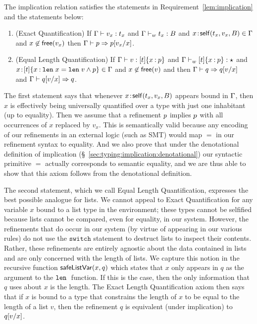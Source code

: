 \begin{requirement}\label{lem:implicationD}
  The implication relation satisfies the statements
  in Requirement~\ref{lem:implication} and the statements below:
  \begin{enumerate}
      \item (Exact Quantification) If
      $\hastype{\tcenv}{v_x}{t_x}$ and
      $\isWellFormed{\tcenv}{t_x}{\skbase}$ and 
      $\bind{x}{\self{t_x}{v_x}{\skbase}} \in \tcenv$ 
      and $x\not\in \free{v_x}$ then
      $\imply{\tcenv}{\spred}{\subst{\spred}{x}{v_x}}$.
      \item (Equal Length Quantification) If
      $\hastype{\tcenv}{\sval}{\breft{\listtype{\stype}}{x}{\spred}}$ and
      $\isWellFormed{\tcenv}{\breft{\listtype{\stype}}{x}{\spred}}{\skstar}$ and \\
      $\bind{x}{\breft{\listtype{\stype}}{x}{\len x = \len \sval \wedge \spred}} \in \tcenv$ 
      and $x\not\in \free{\sval}$ and  then
      $\imply{\tcenv}{q}{\subst{q}{x}{\sval}}$\\
      and
      $\imply{\tcenv}{\subst{q}{x}{\sval}}{q}$.
  \end{enumerate}
\end{requirement}

\noindent
The first statement says that whenever 
$\bind{x}{\self{t_x}{v_x}{\skbase}}$ appears 
bound in $\tcenv$, then $x$ is effectively being
universally quantified over a type with just one
inhabitant (up to equality). Then we assume 
that a refinement $\spred$ implies $\spred$ with
all occurrences of $x$ replaced by $v_x$.
%
This is semantically valid because any encoding of 
our refinements in an external logic (such as SMT)
would map $=$ in our refinement syntax to equality.
%
And we also prove that under the denotational definition of
implication (\S~\ref{sec:typing:implication:denotational})
our syntactic primitive $=$ actually corresponds to semantic
equality, and we are thus able to show that this axiom
follows from the denotational definition.

The second statement, which we call Equal Length Quantification,
expresses the best possible analogue for lists. We cannot
appeal to Exact Quantification for any variable $x$ bound to
a list type in the environment; these types cannot be
selfified because lists cannot be compared, even for equality,
in our system.
%
However, the refinements that do occur in our system (by virtue
of appearing in our various rules) do not use the 
$\texttt{switch}$ statement to destruct lists to inspect
their contents. Rather, these refinements are entirely agnostic
about the data contained in lists and are only concerned with
the length of lists.
%
We capture this notion in the recursive function 
$\safeListVar{x}{q}$ which states that $x$ only appears 
in $q$ as the argument to the $\len$ function.
% 
If this is the case, then the only information that $q$ uses 
about $x$ is the length. The Exact Length Quantification
axiom then says that if $x$ is bound to a type that constrains
the length of $x$ to be equal to the length of a list $v$, 
then the refinement $q$ is equivalent (under implication)
to $\subst{q}{x}{v}$.

